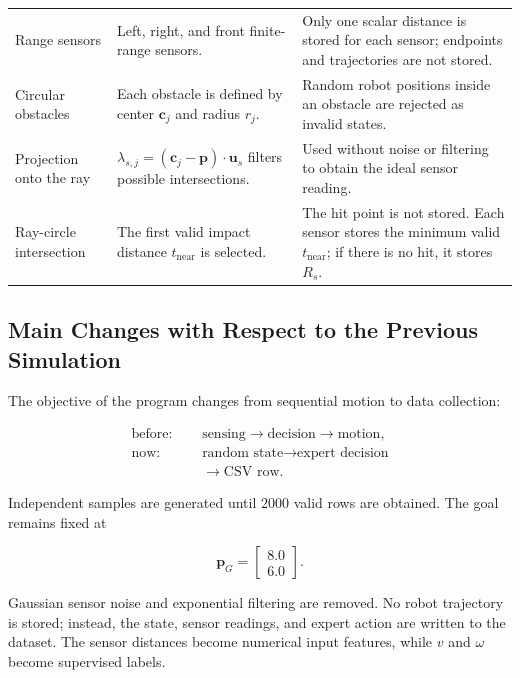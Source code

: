 \documentclass[10pt,twocolumn,a4paper]{article}
\begin{document}
\begin{table}[!t]
\begin{tabular}{>{\raggedright\arraybackslash}p{}
                >{\raggedright\arraybackslash}p{}
                >{\raggedright\arraybackslash}p{}}
Range sensors
& Left, right, and front finite-range sensors.
& Only one scalar distance is stored for each sensor; endpoints and trajectories are not stored. \\

Circular obstacles
& Each obstacle is defined by center $\mathbf{c}_j$ and radius $r_j$.
& Random robot positions inside an obstacle are rejected as invalid states. \\

Projection onto the ray
& $\lambda_{s,j}=(\mathbf{c}_j-\mathbf{p})\cdot\mathbf{u}_s$ filters possible intersections.
& Used without noise or filtering to obtain the ideal sensor reading. \\

Ray-circle intersection
& The first valid impact distance $t_{\mathrm{near}}$ is selected.
& The hit point is not stored. Each sensor stores the minimum valid $t_{\mathrm{near}}$; if there is no hit, it stores $R_s$. \\
\bottomrule
\end{tabular}
\end{table}

\subsection{Main Changes with Respect to the Previous Simulation}

The objective of the program changes from sequential motion to data
collection:

\[
\begin{aligned}
    \text{before: }&\quad
    \text{sensing}\rightarrow\text{decision}\rightarrow\text{motion},\\
    \text{now: }&\quad
    \text{random state}\rightarrow\text{expert decision}\\
    &\quad\longrightarrow\text{CSV row}.
\end{aligned}
\]

Independent samples are generated until $2000$ valid rows are obtained. The
goal remains fixed at

\[
    \mathbf{p}_G=
    \begin{bmatrix}
        8.0\\
        6.0
    \end{bmatrix}.
\]

Gaussian sensor noise and exponential filtering are removed. No robot
trajectory is stored; instead, the state, sensor readings, and expert action
are written to the dataset. The sensor distances become numerical input
features, while $v$ and $\omega$ become supervised labels.
\end{document}

